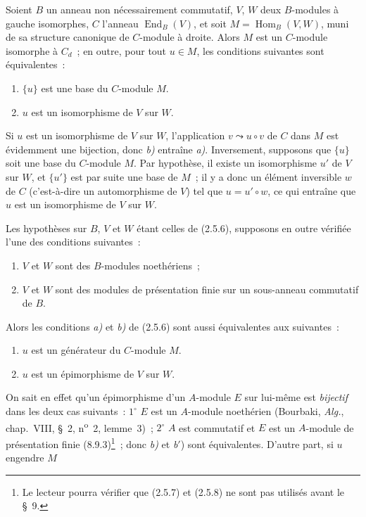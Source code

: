 \begin{lemma}[2.5.6]
\label{IV.2.5.6-fr}
Soient $B$ un anneau non nécessairement commutatif, $V$, $W$ deux
$B$-modules à gauche isomorphes, $C$ l'anneau
$\operatorname{End}_B(V)$, et soit
$M=\operatorname{Hom}_B(V,W)$, muni de sa structure canonique de
$C$-module à droite. Alors $M$ est un $C$-module isomorphe à $C_d$~; en
outre, pour tout $u\in M$, les conditions suivantes sont équivalentes~:
\begin{enumerate}
\item[\emph{a)}] $\{u\}$ est une base du $C$-module $M$.
\item[\emph{b)}] $u$ est un isomorphisme de $V$ sur $W$.
\end{enumerate}
\end{lemma}

Si $u$ est un isomorphisme de $V$ sur $W$, l'application
$v\leadsto u\circ v$ de $C$ dans $M$ est évidemment une bijection, donc
\emph{b)} entraîne \emph{a)}. Inversement, supposons que $\{u\}$ soit une
base du $C$-module $M$. Par hypothèse, il existe un isomorphisme $u'$ de $V$
sur $W$, et $\{u'\}$ est par suite une base de $M$~; il y a donc un élément
inversible $w$ de $C$ (c'est-à-dire un automorphisme de $V$) tel que
$u=u'\circ w$, ce qui entraîne que $u$ est un isomorphisme de $V$ sur $W$.

\begin{corollary}[2.5.7]
\label{IV.2.5.7-fr}
Les hypothèses sur $B$, $V$ et $W$ étant celles de \textup{(2.5.6)}, supposons en
outre vérifiée l'une des conditions suivantes~:
\begin{enumerate}
\item[\textup{(i)}] $V$ et $W$ sont des $B$-modules noethériens~;
\item[\textup{(ii)}] $V$ et $W$ sont des modules de présentation finie sur un
sous-anneau commutatif de $B$.
\end{enumerate}
Alors les conditions \emph{a)} et \emph{b)} de \textup{(2.5.6)} sont aussi
équivalentes aux suivantes~:
\begin{enumerate}
\item[\emph{a}$'$)] $u$ est un générateur du $C$-module $M$.
\item[\emph{b}$'$)] $u$ est un épimorphisme de $V$ sur $W$.
\end{enumerate}
\end{corollary}

On sait en effet qu'un épimorphisme d'un $A$-module $E$ sur lui-même est
\emph{bijectif} dans les deux cas suivants~: $1^\circ$ $E$ est un $A$-module
noethérien (Bourbaki, \emph{Alg.}, chap.~VIII, \S~2,
n\textsuperscript{o}~2, lemme~3)~; $2^\circ$ $A$ est commutatif et $E$ est
un $A$-module de présentation finie (8.9.3)\footnote{Le lecteur pourra
vérifier que (2.5.7) et (2.5.8) ne sont pas utilisés avant le \S~9.}~; donc
\emph{b)} et \emph{b}$'$) sont équivalentes. D'autre part, si $u$ engendre
$M$
